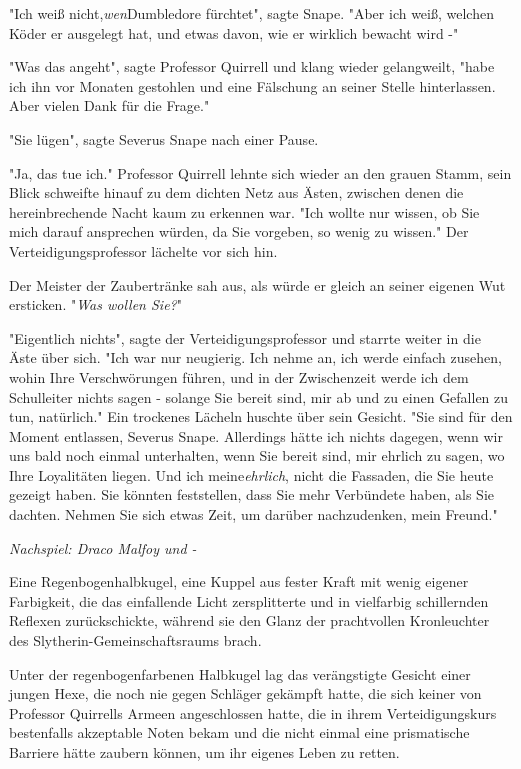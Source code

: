 {"Ich weiß nicht,\emph{wen}Dumbledore fürchtet", sagte Snape. "Aber ich weiß, welchen Köder er ausgelegt hat, und etwas davon, wie er wirklich bewacht wird -"

"Was das angeht", sagte Professor Quirrell und klang wieder gelangweilt, "habe ich ihn vor Monaten gestohlen und eine Fälschung an seiner Stelle hinterlassen. Aber vielen Dank für die Frage."

"Sie lügen", sagte Severus Snape nach einer Pause.

"Ja, das tue ich." Professor Quirrell lehnte sich wieder an den grauen Stamm, sein Blick schweifte hinauf zu dem dichten Netz aus Ästen, zwischen denen die hereinbrechende Nacht kaum zu erkennen war. "Ich wollte nur wissen, ob Sie mich darauf ansprechen würden, da Sie vorgeben, so wenig zu wissen." Der Verteidigungsprofessor lächelte vor sich hin.

Der Meister der Zaubertränke sah aus, als würde er gleich an seiner eigenen Wut ersticken. "\emph{Was wollen Sie?}"

"Eigentlich nichts", sagte der Verteidigungsprofessor und starrte weiter in die Äste über sich. "Ich war nur neugierig. Ich nehme an, ich werde einfach zusehen, wohin Ihre Verschwörungen führen, und in der Zwischenzeit werde ich dem Schulleiter nichts sagen - solange Sie bereit sind, mir ab und zu einen Gefallen zu tun, natürlich." Ein trockenes Lächeln huschte über sein Gesicht. "Sie sind für den Moment entlassen, Severus Snape. Allerdings hätte ich nichts dagegen, wenn wir uns bald noch einmal unterhalten, wenn Sie bereit sind, mir ehrlich zu sagen, wo Ihre Loyalitäten liegen. Und ich meine\emph{ehrlich}, nicht die Fassaden, die Sie heute gezeigt haben. Sie könnten feststellen, dass Sie mehr Verbündete haben, als Sie dachten. Nehmen Sie sich etwas Zeit, um darüber nachzudenken, mein Freund."

\emph{Nachspiel: Draco Malfoy und -}

Eine Regenbogenhalbkugel, eine Kuppel aus fester Kraft mit wenig eigener Farbigkeit, die das einfallende Licht zersplitterte und in vielfarbig schillernden Reflexen zurückschickte, während sie den Glanz der prachtvollen Kronleuchter des Slytherin-Gemeinschaftsraums brach.

Unter der regenbogenfarbenen Halbkugel lag das verängstigte Gesicht einer jungen Hexe, die noch nie gegen Schläger gekämpft hatte, die sich keiner von Professor Quirrells Armeen angeschlossen hatte, die in ihrem Verteidigungskurs bestenfalls akzeptable Noten bekam und die nicht einmal eine prismatische Barriere hätte zaubern können, um ihr eigenes Leben zu retten.

}
